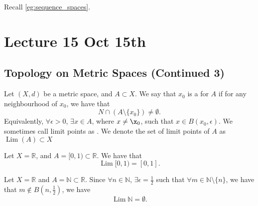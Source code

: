 \documentclass[notoc,notitlepage]{tufte-book}
\DeclareMathOperator{\Lim}{Lim }
\begin{document}
Recall \cref{eg:sequence_spaces}.



\chapter{Lecture 15 Oct 15th}%
\label{chp:lecture_15_oct_15th}

\section{Topology on Metric Spaces (Continued 3)}%
\label{sec:topology_on_metric_spaces_continued_3}

\begin{defn}\label{defn:limit_points}
  Let $(X, d)$ be a metric space, and $A \subset X$. We say that $x_0$ is a  for $A$ if for any neighbourhood of $x_0$, we have that
  \begin{equation*}
    N \cap \left( A \setminus \{ x_0 \} \right) \neq \emptyset.
  \end{equation*}
  Equivalently, $\forall \epsilon > 0$, $\exists x \in A$, where $x \neq \x_0$, such that $x \in B(x_0, \epsilon)$. We sometimes call limit points as . We denote the set of limit points of $A$ as $\Lim(A) \subset X$ 
\end{defn}

\begin{eg}
  Let $X = \mathbb{R}$, and $A = [0, 1) \subset \mathbb{R}$. We have that
  \begin{equation*}
    \Lim[0, 1) = [ 0, 1 ].
  \end{equation*}
\end{eg}

\begin{eg}
  Let $X = \mathbb{R}$ and $A = \mathbb{N} \subset \mathbb{R}$. Since $\forall n \in \mathbb{N}$, $\exists \epsilon = \frac{1}{2}$ such that $\forall m \in \mathbb{N} \setminus \{ n \}$, we have that $m \notin B\left(n, \frac{1}{2}\right)$, we have
  \begin{equation*}
    \Lim \mathbb{N} = \emptyset.
  \end{equation*}
\end{eg}
\end{document}
